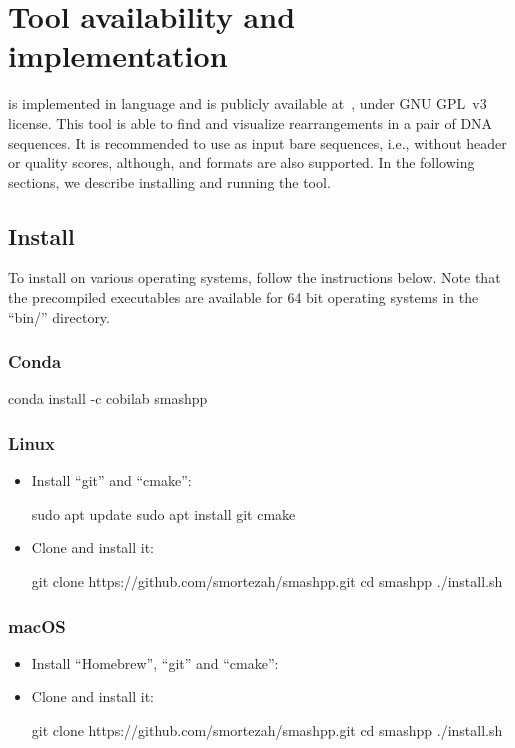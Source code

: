 \documentclass[a4paper,9pt]{extarticle}
\begin{document}
\clearpage
\section{Tool availability and implementation}
\label{sec.tool}
\smashpp is implemented in \cpp language and is publicly available at~\cite{web-smashpp}, under GNU GPL~v3 license. This tool is able to find and visualize rearrangements in a pair of DNA sequences. It is recommended to use as input bare sequences, i.e., without header or quality scores, although, \fasta and \fastq formats are also supported. In the following sections, we describe installing and running the \smashpp tool.

\subsection{Install}
To install \smashpp on various operating systems, follow the instructions below. Note that the precompiled executables are available for 64 bit operating systems in the ``bin/'' directory.

\subsubsection*{Conda}
\begin{code}[style=bash]
  conda install -c cobilab smashpp
\end{code}

\subsubsection*{Linux}
\begin{itemize}
  \item Install ``git'' and ``cmake'':
\begin{code}[style=bash]
sudo apt update
sudo apt install git cmake
\end{code}
\item Clone \smashpp and install it:
\begin{code}[style=bash]
git clone https://github.com/smortezah/smashpp.git
cd smashpp
./install.sh
\end{code}
\end{itemize}

\subsubsection*{macOS}
\begin{itemize}
    \item Install ``Homebrew'', ``git'' and ``cmake'':
\item Clone \smashpp and install it:
\begin{code}[style=bash]
git clone https://github.com/smortezah/smashpp.git
cd smashpp
./install.sh
\end{code}
\end{itemize}
\end{document}
